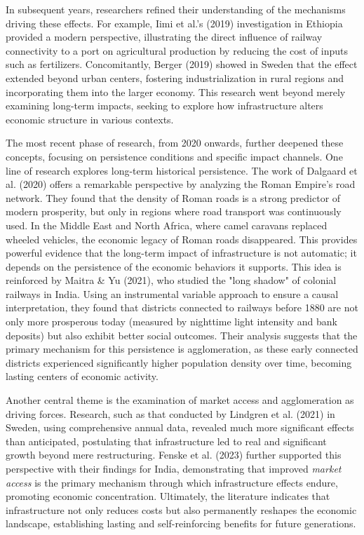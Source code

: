 \documentclass[12pt, a4paper]{article}
\begin{document}
In subsequent years, researchers refined their understanding of the mechanisms driving these effects. For example, Iimi et al.'s (2019) investigation in Ethiopia provided a modern perspective, illustrating the direct influence of railway connectivity to a port on agricultural production by reducing the cost of inputs such as fertilizers. Concomitantly, Berger (2019) showed in Sweden that the effect extended beyond urban centers, fostering industrialization in rural regions and incorporating them into the larger economy. This research went beyond merely examining long-term impacts, seeking to explore how infrastructure alters economic structure in various contexts.

The most recent phase of research, from 2020 onwards, further deepened these concepts, focusing on persistence conditions and specific impact channels. One line of research explores long-term historical persistence. The work of Dalgaard et al. (2020) offers a remarkable perspective by analyzing the Roman Empire's road network. They found that the density of Roman roads is a strong predictor of modern prosperity, but only in regions where road transport was continuously used. In the Middle East and North Africa, where camel caravans replaced wheeled vehicles, the economic legacy of Roman roads disappeared. This provides powerful evidence that the long-term impact of infrastructure is not automatic; it depends on the persistence of the economic behaviors it supports. This idea is reinforced by Maitra \& Yu (2021), who studied the "long shadow" of colonial railways in India. Using an instrumental variable approach to ensure a causal interpretation, they found that districts connected to railways before 1880 are not only more prosperous today (measured by nighttime light intensity and bank deposits) but also exhibit better social outcomes. Their analysis suggests that the primary mechanism for this persistence is agglomeration, as these early connected districts experienced significantly higher population density over time, becoming lasting centers of economic activity.

Another central theme is the examination of market access and agglomeration as driving forces. Research, such as that conducted by Lindgren et al. (2021) in Sweden, using comprehensive annual data, revealed much more significant effects than anticipated, postulating that infrastructure led to real and significant growth beyond mere restructuring. Fenske et al. (2023) further supported this perspective with their findings for India, demonstrating that improved \textit{market access} is the primary mechanism through which infrastructure effects endure, promoting economic concentration. Ultimately, the literature indicates that infrastructure not only reduces costs but also permanently reshapes the economic landscape, establishing lasting and self-reinforcing benefits for future generations.
\end{document}

